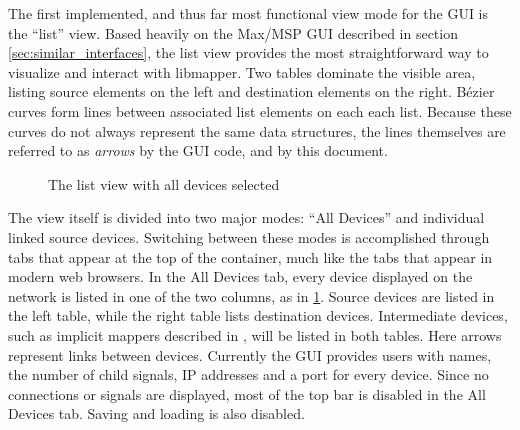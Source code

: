 The first implemented, and thus far most functional view mode for the GUI is the ``list'' view. Based heavily on the Max/MSP GUI described in section \ref{sec:similar_interfaces}, the list view provides the most straightforward way to visualize and interact with libmapper. Two tables dominate the visible area, listing source elements on the left and destination elements on the right. B\'ezier curves form lines between associated list elements on each each list. Because these curves do not always represent the same data structures, the lines themselves are referred to as \emph{arrows} by the GUI code, and by this document.

\begin{figure}[ht]
\centering
\caption{The list view with all devices selected}
\label{fig:list_view_all_devices}
\end{figure}

The view itself is divided into two major modes: ``All Devices'' and individual linked source devices. Switching between these modes is accomplished through tabs that appear at the top of the container, much like the tabs that appear in modern web browsers. In the All Devices tab, every device displayed on the network is listed in one of the two columns, as in \ref{fig:list_view_all_devices}. Source devices are listed in the left table, while the right table lists destination devices. Intermediate devices, such as implicit mappers described in \cite{interpolated_mappings}, will be listed in both tables. Here arrows represent links between devices. Currently the GUI provides users with names, the number of child signals, IP addresses and a port for every device. Since no connections or signals are displayed, most of the top bar is disabled in the All Devices tab. Saving and loading is also disabled.

